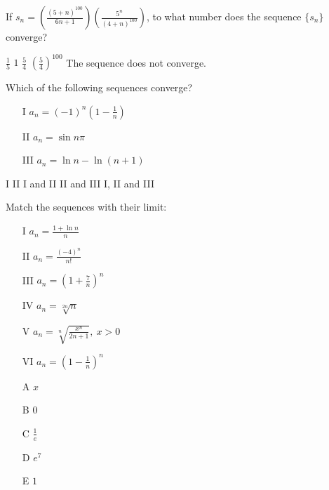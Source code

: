 \begin{questions}
\question[2] If $s_n =
(\frac{(5+n)^{100}}{6{n+1}})(\frac{5^n}{(4+n)^{100}})$, to what number
does the sequence $\{s_n\}$ converge?

    \begin{oneparchoices}
    \CorrectChoice $\frac{1}{5}$
    \choice $1$
    \choice $\frac{5}{4}$
    \choice $(\frac{5}{4})^{100}$
    \choice The sequence does not converge.
    \end{oneparchoices}

\question[2] Which of the following sequences converge?

    \begin{enumerate}
    \item[I] $a_n = (-1)^n(1 - \frac{1}{n})$
    \item[II] $a_n = \sin n\pi$
    \item[III] $a_n = \ln n - \ln (n+1)$
    \end{enumerate}

    \begin{oneparchoices}
    \choice I
    \choice II
    \choice I and II
    \CorrectChoice II and III
    \choice I, II and III
    \end{oneparchoices}

\question[3] Match the sequences with their limit:

    \begin{enumerate}
    \item[I]   $a_n = \frac{1 + \ln n}{n}$
    \item[II]  $a_n = \frac{(-4)^n}{n!}$
    \item[III] $a_n = (1 + \frac{7}{n})^n$
    \item[IV]  $a_n = \sqrt[2n]{n}$
    \item[V]   $a_n = \sqrt[n]{\frac{x^n}{2n+1}},\ x > 0$
    \item[VI]  $a_n = (1 - \frac{1}{n})^n$
    \end{enumerate}

    \begin{enumerate}
    \item[A] $x$
    \item[B] $0$
    \item[C] $\frac{1}{e}$
    \item[D] $e^7$
    \item[E] $1$
    \end{enumerate}


\end{questions}
